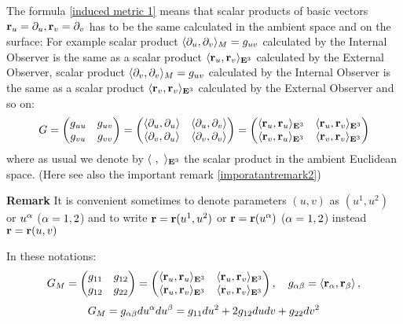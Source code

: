 \documentclass[12pt]{article}
\theoremstyle{theorem}
\numberwithin{equation}{section}
\begin{document}
The formula \eqref{induced metric 1} means that scalar products of basic vectors  ${\bf r}_u=\partial_u, {\bf r}_v=\partial_v$
has to be  the same calculated in the ambient space and on the surface:
For example scalar product  $\langle\partial_u,\partial_v\rangle_M=g_{uv}$ calculated by the Internal Observer
is the same as a scalar product  $\langle{\bf r}_u,{\bf r}_v\rangle_{{\bf E}^3}$ calculated by the External Observer,
scalar product  $\langle\partial_v,\partial_v\rangle_M=g_{uv}$ calculated by the Internal Observer
is the same as a scalar product  $\langle{\bf r}_v,{\bf r}_v\rangle_{{\bf E}^3}$ calculated by the External Observer and so on:
               \begin{equation}\label{inducedmetric 3}
   G=\begin{pmatrix}g_{uu} &g_{uv}\cr g_{vu} &g_{vv}\cr\end{pmatrix}=
    \begin{pmatrix}\langle\partial_u,\partial_u\rangle &\langle\partial_u,\partial_v\rangle\cr
     \langle\partial_v,\partial_u\rangle &\langle\partial_v,\partial_v\rangle\cr\end{pmatrix}=
     \begin{pmatrix}\langle{\bf r}_u,{\bf r}_u\rangle_{{\bf E}^3} &\langle{\bf r}_u,{\bf r}_v\rangle_{{\bf E}^3}\cr
     \langle{\bf r}_v,{\bf r}_u\rangle_{{\bf E}^3} &\langle{\bf r}_v,{\bf r}_v\rangle_{{\bf E}^3}\cr\end{pmatrix}
     \end{equation}
where as usual we denote by $\langle\,\,,\,\,\rangle_{{\bf E}^3}$ the scalar product in the ambient Euclidean space.
(Here see also the important remark \eqref{imporatantremark2})

  {\bf Remark}   It is convenient sometimes to denote
    parameters $(u,v)$ as $(u^1,u^2)$ or $u^\alpha$ ($\alpha=1,2$)
   and to write ${\bf r}={\bf r}(u^1,u^2)$ or ${\bf r}={\bf r}(u^\alpha)$ ($\alpha=1,2$)
   instead ${\bf r}={\bf r}(u,v)$

In these notations:
\begin{equation*}
    G_M=
\begin{pmatrix}
   g_{11} & g_{12} \\
   g_{12}& g_{22} \\
   \end{pmatrix}=
   \begin{pmatrix}
   \langle{\bf r}_u,{\bf r}_u\rangle_{{\bf E}^3} & \langle{\bf r}_u,{\bf r}_v\rangle_{{\bf E}^3} \\
   \langle{\bf r}_u,{\bf r}_v\rangle_{{\bf E}^3} & \langle{\bf r}_v,{\bf r}_v\rangle_{{\bf E}^3} \\
   \end{pmatrix},\quad g_{\alpha\beta}=\langle{\bf r}_\alpha,{\bf r}_\beta\rangle\,,
\end{equation*}
             \begin{equation}\label{firstquadraticform}
          G_M=g_{\alpha\beta}du^\alpha du^\beta=g_{11}du^2+2g_{12}dudv+g_{22}dv^2
             \end{equation}
\end{document}
